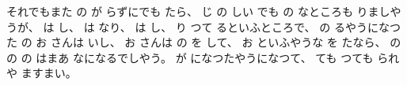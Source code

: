 %
それでもまた
の
が
らずにでも
たら、
%
じ
の
しい
でも
の
なところも
りましやうが、
%
は
し、
%
は
なり、
%
は
し、
%
り
つて
るといふところで、
%
の
るやうになつた
の
お
さんは
いし、
%
お
さんは
の
を
して、
%
お
といふやうな
を
たなら、
%
の
の
の
はまあ
なになるでしやう。
%
が
になつたやうになつて、
%
ても
つても
られや
ますまい。

